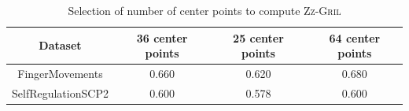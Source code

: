 \documentclass{article}
\newcommand{\zzgril}{\textsc{Zz-Gril}}
\theoremstyle{plain}
\theoremstyle{definition}
\theoremstyle{remark}
\begin{document}
\begin{table}[htbp]
    \centering
    \caption{Information about UEA Datasets used for experiments}
    \label{tab:app:dataset_info}
\end{table}

\begin{table}[h!]
    \centering
    \begin{tabular}{cccc}
    \toprule
        \textbf{Dataset} & \textbf{36 center points} & \textbf{25 center points} & \textbf{64 center points}\\
        \midrule
         FingerMovements& 0.660 & 0.620 & 0.680 \\
         SelfRegulationSCP2 &0.600 & 0.578 & 0.600 \\
         \bottomrule
    \end{tabular}
    \caption{Selection of number of center points to compute \zzgril{}}
    \label{tab:app:hyperparam1}
\end{table}

\begin{table}[h!]
    \centering
    \caption{Selection of overlap between time windows for time-series modelled as a sequence of graphs. The $window\_size$ is fixed to be $max(128//series\_len, 5$).}
    \label{tab:app:hyperparam2}
\end{table}
\end{document}
